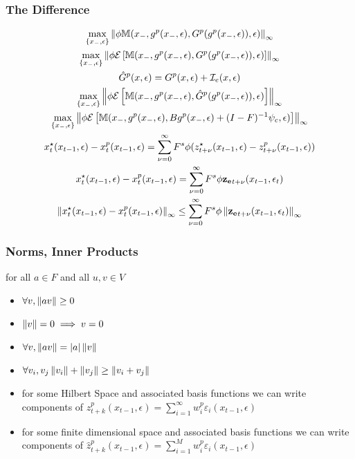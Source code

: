 \documentclass[tikz]{beamer}
\begin{document}
\begin{frame}
  \frametitle{The Difference}
{\small
  \begin{gather}
    \label{eq:3}
\max_{\{x_{-},\epsilon\}} \left\lVert \phi \mathbb{M}(x_{-},g^p(x_{-},\epsilon),G^p(g^p(x_{-},\epsilon)),\epsilon) \right\rVert_\infty\\
\max_{\{x_{-},\epsilon\}} \left\lVert \phi {\mathcal{E}\left [  \mathbb{M}(x_{-},g^p(x_{-},\epsilon),G^p(g^p(x_{-},\epsilon)),\epsilon) \right ]} \right\rVert_\infty\\
\hat{G}^p(x,\epsilon)=G^p(x,\epsilon)+ \mathcal{I}_e(x,\epsilon)\\
\max_{\{x_{-},\epsilon\}} \left\lVert \phi {\mathcal{E}\left [  \mathbb{M}(x_{-},g^p(x_{-},\epsilon),\hat{G}^p(g^p(x_{-},\epsilon)),\epsilon) \right ]} \right\rVert_\infty\\
\max_{\{x_{-},\epsilon\}} \left\lVert \phi {\mathcal{E}\left [  \mathbb{M}(x_{-},g^p(x_{-},\epsilon),B g^p(x_{-},\epsilon)+(I-F)^{-1}\psi_c,\epsilon) \right ]} \right\rVert_\infty\\
	 x^\star_{t}(x_{t-1},\epsilon) -	 x^p_{t}(x_{t-1},\epsilon) =
\sum_{{\nu}=0}^\infty F^s \phi (z^\star_{t+{\nu}}(x_{t-1},\epsilon)-z^p_{t+{\nu}}(x_{t-1},\epsilon))     \\
	 x^\star_{t}(x_{t-1},\epsilon) -	 x^p_{t}(x_{t-1},\epsilon) =
\sum_{{\nu}=0}^\infty F^s \phi \mathbf{z_e}_{t+{\nu}}(x_{t-1},\epsilon_t)   \\ 
	\left\lVert x^\star_{t}(x_{t-1},\epsilon) -	 x^p_{t}(x_{t-1},\epsilon)\right\rVert_\infty \le
\sum_{{\nu}=0}^\infty F^s \phi \left\lVert\mathbf{z_e}_{t+{\nu}}(x_{t-1},\epsilon_t)\right\rVert_\infty    
  \end{gather}
}
\end{frame}

\begin{frame}
  \frametitle{Norms, Inner Products}

for all $a \in F$  and all $u, v \in V$
  \begin{itemize}
 \item $\forall v, \left\lVert a v\right\rVert \ge 0$
 \item $\left\lVert v\right\rVert =0 \implies v=0$
  \item $\forall v, \left\lVert a v\right\rVert = |a| \left\lVert v\right\rVert$
  \item $\forall v_i,v_j \left\lVert v_i\right\rVert +  \left\lVert v_j\right\rVert \ge  \left\lVert v_i+v_j\right\rVert$
  \item for some Hilbert Space and associated  basis functions we can write components of $z_{t+k}^p(x_{t-1},\epsilon)= \sum_{i=1}^\infty w^p_i\varepsilon_i(x_{t-1},\epsilon)$ 
  \item for some finite dimensional space and associated 
 basis functions we can write components of $\hat{z}_{t+k}^p(x_{t-1},\epsilon)= \sum_{i=1}^M w^p_i\varepsilon_i(x_{t-1},\epsilon)$ 
  \end{itemize}
\end{frame}
\end{document}
